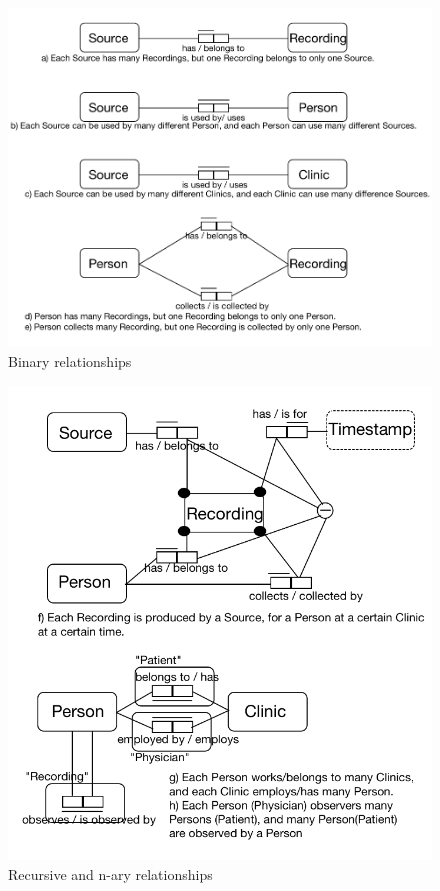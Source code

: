 \begin{figure}[ht]
    \centering
    \includegraphics[width=1.0\textwidth]{Figures/RelationshipBinary.png}
    \caption{Binary relationships}
    \label{fig:Figures/RelationshipBinary}
\end{figure}
\begin{figure}
    \centering
    \includegraphics[width=1.0\textwidth]{Figures/NaryAndRecursive.png}
    \caption{Recursive and n-ary relationships}
    \label{fig:Figures/NaryAndRecursive}
\end{figure}
